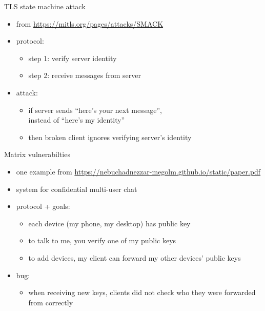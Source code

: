 \begin{frame}{TLS state machine attack}
    \begin{itemize}
    \item from \url{https://mitls.org/pages/attacks/SMACK}
    \item protocol:
        \begin{itemize}
        \item step 1: verify server identity
        \item step 2: receive messages from server
        \end{itemize}
    \item attack:
        \begin{itemize}
        \item if server sends ``here's your next message'', \\
            instead of ``here's my identity'' \\
        \item then broken client ignores verifying server's identity
        \end{itemize}
    \end{itemize}
\end{frame}

\begin{frame}{Matrix vulnerabilties}
    \begin{itemize}
    \item one example from \url{https://nebuchadnezzar-megolm.github.io/static/paper.pdf}
    \item system for confidential multi-user chat
    \vspace{.5cm}
    \item protocol + goals:
        \begin{itemize}
        \item each device (my phone, my desktop) has public key
        \item to talk to me, you verify one of my public keys
        \item to add devices, my client can forward my other devices' public keys
        \end{itemize}
    \item bug:
        \begin{itemize}
        \item when receiving new keys, clients did not check who they were forwarded from correctly
        \end{itemize}
    \end{itemize}
\end{frame}
